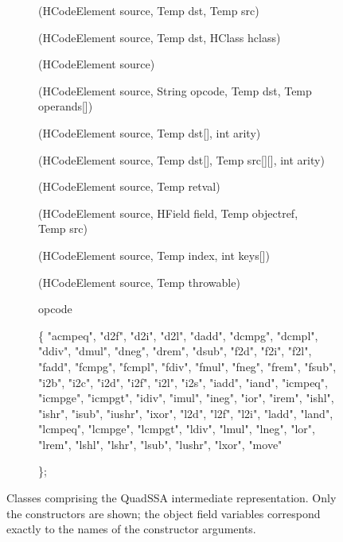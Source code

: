 \documentclass[11pt,notitlepage,twocolumn,twoside]{article}
\begin{document}
\begin{figure*}
{\begin{description}
\item[](HCodeElement source, Temp dst, Temp src)
\item[](HCodeElement source, Temp dst, HClass hclass)
\item[](HCodeElement source)
\item[](HCodeElement source, String opcode, Temp dst, 
                  Temp operands[])
\item[](HCodeElement source, Temp dst[], int arity)
\item[](HCodeElement source, Temp dst[], Temp src[][], int arity)
\item[](HCodeElement source, Temp retval) 
\item[](HCodeElement source, HField field, Temp objectref, \\ 
                 Temp src) 
\item[](HCodeElement source, Temp index, int keys[])
\item[](HCodeElement source, Temp throwable)
\item[]
\item[]  opcode  
\item[] \{  "acmpeq", "d2f", "d2i", "d2l", "dadd", "dcmpg",
"dcmpl", "ddiv", "dmul", "dneg", "drem", "dsub", "f2d", "f2i", "f2l",
"fadd", "fcmpg", "fcmpl", "fdiv", "fmul", "fneg", "frem", "fsub",
"i2b", "i2c", "i2d", "i2f", "i2l", "i2s", "iadd", "iand", "icmpeq",
"icmpge", "icmpgt", "idiv", "imul", "ineg", "ior", "irem", "ishl",
"ishr", "isub", "iushr", "ixor", "l2d", "l2f", "l2i", "ladd", "land",
"lcmpeq", "lcmpge", "lcmpgt", "ldiv", "lmul", "lneg", "lor", "lrem",
"lshl", "lshr", "lsub", "lushr", "lxor", "move"
\item[] \};
\end{description}
}

\caption{Classes comprising the QuadSSA intermediate representation.
Only the constructors are shown; the object field variables correspond
exactly to the names of the constructor arguments.}
\label{fig:classes}
\end{figure*}


\end{document}
